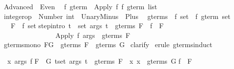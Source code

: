 %
\begin{isabellebody}%
\def\isabellecontext{Advanced}%
%
\isadelimtheory
\isanewline
%
\endisadelimtheory
%
\isatagtheory
{}\isamarkupfalse%
\ Advanced\ \ Even\ %
\endisatagtheory
{\isafoldtheory}%
%
\isadelimtheory
\isanewline
%
\endisadelimtheory
\isanewline
\isanewline
{}\isamarkupfalse%
\ {\isacharprime}f\ gterm\ {\isacharequal}\ Apply\ {\isacharprime}f\ {\isachardoublequoteopen}{\isacharprime}f\ gterm\ list{\isachardoublequoteclose}\isanewline
\isanewline
{}\isamarkupfalse%
\ integer{\isacharunderscore}op\ {\isacharequal}\ Number\ int\ {\isacharbar}\ UnaryMinus\ {\isacharbar}\ Plus\isanewline
\isanewline
{}\isamarkupfalse%
\isanewline
\ \ gterms\ {\isacharcolon}{\isacharcolon}\ {\isachardoublequoteopen}{\isacharprime}f\ set\ {\isasymRightarrow}\ {\isacharprime}f\ gterm\ set{\isachardoublequoteclose}\isanewline
\ \ \ F\ {\isacharcolon}{\isacharcolon}\ {\isachardoublequoteopen}{\isacharprime}f\ set{\isachardoublequoteclose}\isanewline
{}\isanewline
step{\isacharbrackleft}intro{\isacharbang}{\isacharbrackright}{\isacharcolon}\ {\isachardoublequoteopen}{\isasymlbrakk}{\isasymforall}t\ {\isasymin}\ set\ args{\isachardot}\ t\ {\isasymin}\ gterms\ F{\isacharsemicolon}\ \ f\ {\isasymin}\ F{\isasymrbrakk}\isanewline
\ \ \ \ \ \ \ \ \ \ \ \ \ \ \ {\isasymLongrightarrow}\ {\isacharparenleft}Apply\ f\ args{\isacharparenright}\ {\isasymin}\ gterms\ F{\isachardoublequoteclose}\isanewline
\isanewline
{}\isamarkupfalse%
\ gterms{\isacharunderscore}mono{\isacharcolon}\ {\isachardoublequoteopen}F{\isasymsubseteq}G\ {\isasymLongrightarrow}\ gterms\ F\ {\isasymsubseteq}\ gterms\ G{\isachardoublequoteclose}\isanewline
%
\isadelimproof
%
\endisadelimproof
%
\isatagproof
{}\isamarkupfalse%
\ clarify\isanewline
{}\isamarkupfalse%
\ {\isacharparenleft}erule\ gterms{\isachardot}induct{\isacharparenright}%
\begin{isamarkuptxt}%
\begin{isabelle}%
\ {}{\isachardot}\ {\isasymAnd}x\ args\ f{\isachardot}\isanewline
{}F\ {\isasymsubseteq}\ G{\isacharsemicolon}\ {\isasymforall}t{\isasymin}set\ args{\isachardot}\ t\ {\isasymin}\ gterms\ F\ {\isasyminter}\ {\isacharbraceleft}x{\isachardot}\ x\ {\isasymin}\ gterms\ G{\isacharbraceright}{\isacharsemicolon}\isanewline
{}f\ {\isasymin}\ F{\isasymrbrakk}\isanewline

\end{isabelle}
\end{isamarkuptxt}
\end{isabellebody}
